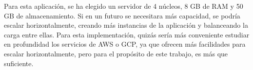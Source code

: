 Para esta aplicación, se ha elegido un servidor de 4 núcleos, 8 GB de RAM y 50 GB de almacenamiento.
Si en un futuro se necesitara más capacidad, se podría escalar horizontalmente, creando más instancias de la aplicación y balanceando la carga entre ellas.
Para esta implementación, quizás sería más conveniente estudiar en profundidad los servicios de AWS o GCP, ya que ofrecen más facilidades para escalar horizontalmente, pero para el propósito de este trabajo, es más que suficiente.





\endinput